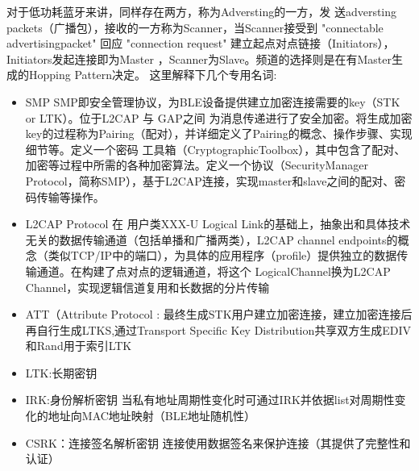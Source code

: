 对于低功耗蓝牙来讲，同样存在两方，称为Adversting的一方，发 送adversting packets（广播包），接收的一方称为Scanner，当Scanner接受到 "connectable advertisingpacket" 回应 "connection request"  建立起点对点链接（Initiators），Initiators发起连接即为Master ，Scanner为Slave。频道的选择则是在有Master生成的Hopping Pattern决定。
这里解释下几个专用名词:
\begin{itemize}
    \item SMP SMP即安全管理协议，为BLE设备提供建立加密连接需要的key（STK or LTK）。位于L2CAP 与 GAP之间 为消息传递进行了安全加密。将生成加密key的过程称为Pairing（配对），并详细定义了Pairing的概念、操作步骤、实现细节等。定义一个密码 工具箱（CryptographicToolbox），其中包含了配对、加密等过程中所需的各种加密算法。定义一个协议（SecurityManager Protocol，简称SMP），基于L2CAP连接，实现master和slave之间的配对、密码传输等操作。
    \item L2CAP Protocol 在 用户类XXX-U Logical Link的基础上，抽象出和具体技术无关的数据传输通道（包括单播和广播两类），L2CAP channel endpoints的概念（类似TCP/IP中的端口），为具体的应用程序（profile）提供独立的数据传输通道。在构建了点对点的逻辑通道，将这个 LogicalChannel换为L2CAP Channel，实现逻辑信道复用和长数据的分片传输
    \item ATT（Attribute Protocol : 最终生成STK用户建立加密连接，建立加密连接后再自行生成LTKS,通过Transport Specific Key Distribution共享双方生成EDIV和Rand用于索引LTK
    \item LTK:长期密钥
    \item IRK:身份解析密钥   当私有地址周期性变化时可通过IRK并依据list对周期性变化的地址向MAC地址映射（BLE地址随机性）
    \item CSRK：连接签名解析密钥  连接使用数据签名来保护连接（其提供了完整性和认证）
\end{itemize}


